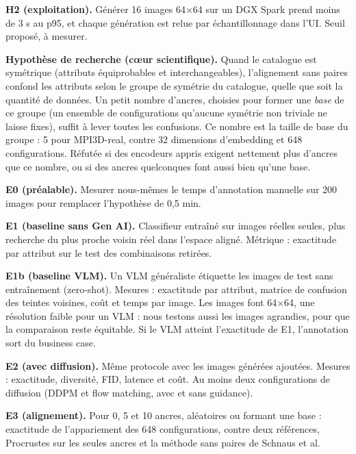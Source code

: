 \documentclass[10pt,a4paper]{article}
\begin{document}
\textbf{H2 (exploitation).} Générer 16 images 64$\times$64 sur un DGX Spark prend moins de 3 s au p95, et chaque génération est relue par échantillonnage dans l'UI. Seuil proposé, à mesurer.

\textbf{Hypothèse de recherche (cœur scientifique).} Quand le catalogue est symétrique (attributs équiprobables et interchangeables), l'alignement sans paires confond les attributs selon le groupe de symétrie du catalogue, quelle que soit la quantité de données. Un petit nombre d'ancres, choisies pour former une \emph{base} de ce groupe (un ensemble de configurations qu'aucune symétrie non triviale ne laisse fixes), suffit à lever toutes les confusions. Ce nombre est la taille de base du groupe : 5 pour MPI3D-real, contre 32 dimensions d'embedding et 648 configurations. Réfutée si des encodeurs appris exigent nettement plus d'ancres que ce nombre, ou si des ancres quelconques font aussi bien qu'une base.

\textbf{E0 (préalable).} Mesurer nous-mêmes le temps d'annotation manuelle sur 200 images pour remplacer l'hypothèse de 0,5 min.

\textbf{E1 (baseline sans Gen AI).} Classifieur entraîné sur images réelles seules, plus recherche du plus proche voisin réel dans l'espace aligné. Métrique : exactitude par attribut sur le test des combinaisons retirées.

\textbf{E1b (baseline VLM).} Un VLM généraliste étiquette les images de test sans entraînement (zero-shot). Mesures : exactitude par attribut, matrice de confusion des teintes voisines, coût et temps par image. Les images font 64$\times$64, une résolution faible pour un VLM : nous testons aussi les images agrandies, pour que la comparaison reste équitable. Si le VLM atteint l'exactitude de E1, l'annotation sort du business case.

\textbf{E2 (avec diffusion).} Même protocole avec les images générées ajoutées. Mesures : exactitude, diversité, FID, latence et coût. Au moins deux configurations de diffusion (DDPM et flow matching, avec et sans guidance).

\textbf{E3 (alignement).} Pour 0, 5 et 10 ancres, aléatoires ou formant une base : exactitude de l'appariement des 648 configurations, contre deux références, Procrustes sur les seules ancres et la méthode sans paires de Schnaus et al.
\end{document}
